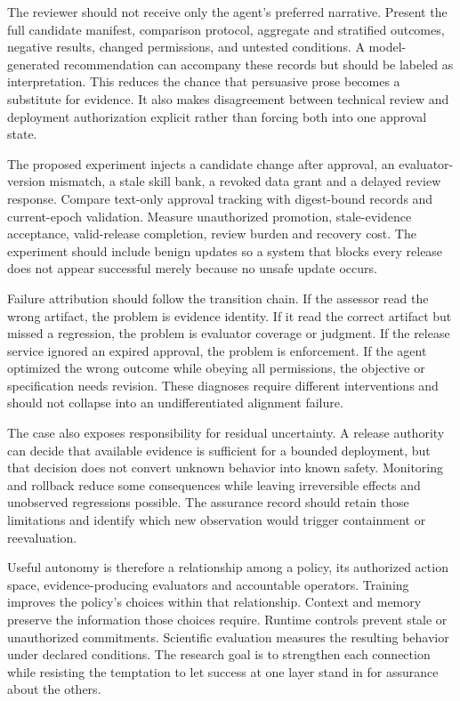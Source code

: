 The reviewer should not receive only the agent's preferred narrative. Present the full candidate manifest, comparison protocol, aggregate and stratified outcomes, negative results, changed permissions, and untested conditions. A model-generated recommendation can accompany these records but should be labeled as interpretation. This reduces the chance that persuasive prose becomes a substitute for evidence. It also makes disagreement between technical review and deployment authorization explicit rather than forcing both into one approval state.

The proposed experiment injects a candidate change after approval, an evaluator-version mismatch, a stale skill bank, a revoked data grant and a delayed review response. Compare text-only approval tracking with digest-bound records and current-epoch validation. Measure unauthorized promotion, stale-evidence acceptance, valid-release completion, review burden and recovery cost. The experiment should include benign updates so a system that blocks every release does not appear successful merely because no unsafe update occurs.

Failure attribution should follow the transition chain. If the assessor read the wrong artifact, the problem is evidence identity. If it read the correct artifact but missed a regression, the problem is evaluator coverage or judgment. If the release service ignored an expired approval, the problem is enforcement. If the agent optimized the wrong outcome while obeying all permissions, the objective or specification needs revision. These diagnoses require different interventions and should not collapse into an undifferentiated alignment failure.

The case also exposes responsibility for residual uncertainty. A release authority can decide that available evidence is sufficient for a bounded deployment, but that decision does not convert unknown behavior into known safety. Monitoring and rollback reduce some consequences while leaving irreversible effects and unobserved regressions possible. The assurance record should retain those limitations and identify which new observation would trigger containment or reevaluation.

Useful autonomy is therefore a relationship among a policy, its authorized action space, evidence-producing evaluators and accountable operators. Training improves the policy's choices within that relationship. Context and memory preserve the information those choices require. Runtime controls prevent stale or unauthorized commitments. Scientific evaluation measures the resulting behavior under declared conditions. The research goal is to strengthen each connection while resisting the temptation to let success at one layer stand in for assurance about the others.

